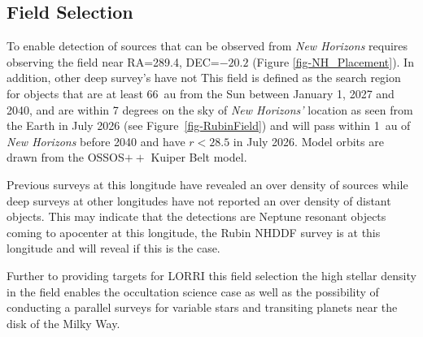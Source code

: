 \documentclass[modern,preprint]{aastex7}
\begin{document}
\subsection{Field Selection}
To enable detection of sources that can be observed from {\it New Horizons} requires observing the field near RA=289.4, DEC=$-20.2$ (Figure \ref{fig-NH_Placement}). 
In addition, other deep survey's have not 
This field is defined as the search region for objects that are at least 66~au from the Sun between January 1, 2027 and 2040, and are within 7 degrees on the sky of {\it New Horizons'} location as seen from the Earth in July 2026 (see Figure~\ref{fig-RubinField}) and will pass within 1~au of {\it New Horizons} before 2040 and have $r <28.5$ in July 2026. 
Model orbits are drawn from the OSSOS$++$ Kuiper Belt model. 

Previous surveys at this longitude have revealed an over density of sources while deep surveys at other longitudes \citep[e.g.][]{Napier2023} have not reported an over density of distant objects. This may indicate that the \citet{Fraser2024PSJ} detections are Neptune resonant objects coming to apocenter at this longitude, the Rubin NHDDF survey is at this longitude and will reveal if this is the case.

Further to providing targets for LORRI this field selection the high stellar density in the field enables the occultation science case as well as the possibility of conducting a parallel surveys for variable stars and transiting planets near the disk of the Milky Way.  
\end{document}
